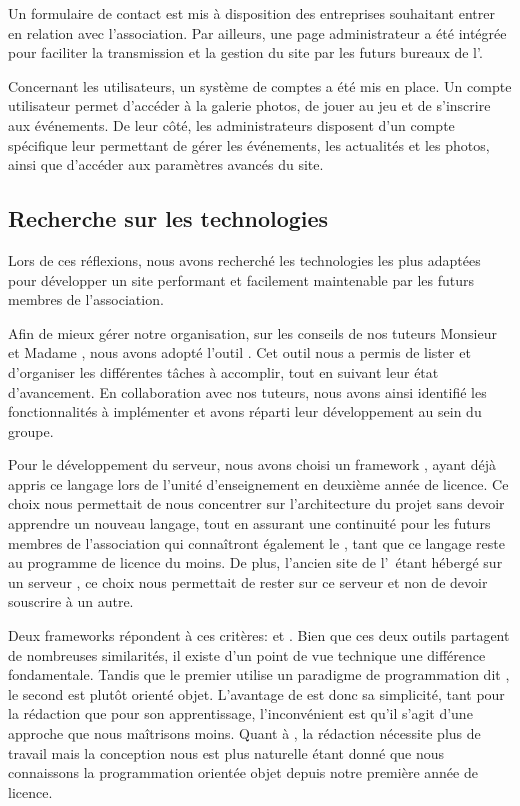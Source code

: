 Un formulaire de contact est mis à disposition des entreprises souhaitant entrer en relation avec l’association. Par ailleurs, une page administrateur a été intégrée pour faciliter la transmission et la gestion du site par les futurs bureaux de l’\ofni.  

Concernant les utilisateurs, un système de comptes a été mis en place. Un compte utilisateur permet d’accéder à la galerie photos, de jouer au jeu et de s’inscrire aux événements. De leur côté, les administrateurs disposent d’un compte spécifique leur permettant de gérer les événements, les actualités et les photos, ainsi que d’accéder aux paramètres avancés du site.

\subsection{Recherche sur les technologies}

Lors de ces réflexions, nous avons recherché les technologies les plus adaptées pour développer un site performant et facilement maintenable par les futurs membres de l’association.
\bigskip

Afin de mieux gérer notre organisation, sur les conseils de nos tuteurs Monsieur  et Madame , nous avons adopté l’outil . Cet outil nous a permis de lister et d’organiser les différentes tâches à accomplir, tout en suivant leur état d'avancement. En collaboration avec nos tuteurs, nous avons ainsi identifié les fonctionnalités à implémenter et avons réparti leur développement au sein du groupe.
\bigskip

Pour le développement du serveur, nous avons choisi un framework , ayant déjà appris ce langage lors de l’unité d’enseignement  en deuxième année de licence. Ce choix nous permettait de nous concentrer sur l’architecture du projet sans devoir apprendre un nouveau langage, tout en assurant une continuité pour les futurs membres de l’association qui connaîtront également le , tant que ce langage reste au programme de licence du moins.
De plus, l'ancien site de l'\ofni\ étant hébergé sur un serveur , ce choix nous permettait de rester sur ce serveur et non de devoir souscrire à un autre.
\bigskip

Deux frameworks répondent à ces critères:  et . Bien que ces deux outils partagent de nombreuses similarités, il existe d'un point de vue technique une différence fondamentale. Tandis que le premier utilise un paradigme de programmation dit , le second est plutôt orienté objet. L'avantage de  est donc sa simplicité, tant pour la rédaction que pour son apprentissage, l'inconvénient est qu'il s'agit d'une approche que nous maîtrisons moins. Quant à , la rédaction nécessite plus de travail mais la conception nous est plus naturelle étant donné que nous connaissons la programmation orientée objet depuis notre première année de licence.
\pagebreak

